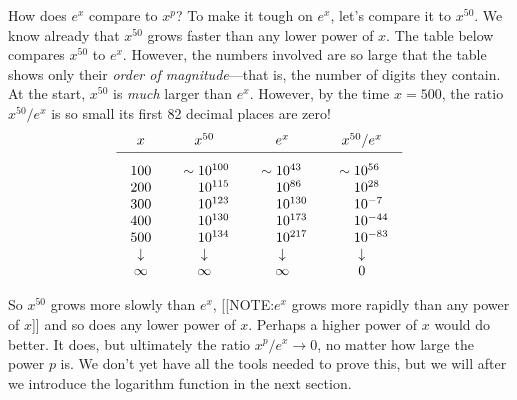 How does $e^x$ compare to $x^p$?  To make it tough on $e^x$, let's
compare it to $x^{50}$.  We know already that $x^{50}$ grows faster
than any lower power of $x$.  The table below compares $x^{50}$ to
$e^x$.  However, the numbers involved are so large that the table
shows only their {\em order of magnitude\/}---that is, the number of
digits they contain.  At the start, $x^{50}$ is {\em much\/} larger
than $e^x$.  However, by the time $x = 500$, the ratio $x^{50}/e^x$ is
so small its first 82 decimal places are zero!
\addtolength{\arraycolsep}{2pt}
	\[
\begin{array}{cccc}
	x & x^{50} & e^x & x^{50}/e^x \\[2pt] \hline
	\begin{array}{r}
	\rule{0pt}{16pt} 100 \\ 200 \\ 300 \\ 400 \\ 500
	\end{array}
	&
	\begin{array}{r}
	\rule{0pt}{16pt} \sim 10^{100} \\ 10^{115} \\ 10^{123}
		\\ 10^{130} \\ 10^{134} 
	\end{array}
	&
	\begin{array}{r}
		\rule{0pt}{16pt} \sim 10^{43\hphantom{0}} \\ 
		10^{86\hphantom{0}}  \\
		10^{130}  \\
		10^{173}  \\
		10^{217}  
	\end{array}
	&
	\begin{array}{r}
		\rule{0pt}{16pt} \sim 10^{56\hphantom{-}} \\ 
		10^{28\hphantom{-}}  \\
		10^{-7\hphantom{0}}  \\
		10^{-44}  \\
		10^{-83}  
	\end{array}
	\\
	\downarrow & \downarrow & \downarrow & \downarrow \\
	\infty & \infty & \infty & 0 
\end{array}
\]
	\addtolength{\arraycolsep}{-2pt}


So $x^{50}$ grows more slowly than $e^x$, 
[[NOTE:$e^x$ grows more rapidly than any power of $x$]]
and so does any lower power of $x$.  Perhaps a higher power of $x$
would do better.  It does, but ultimately the ratio $x^p/e^x \to 0$,
no matter how large the power $p$ is.  We don't yet have all the tools
needed to prove this, but we will after we introduce the logarithm
function in the next section.

